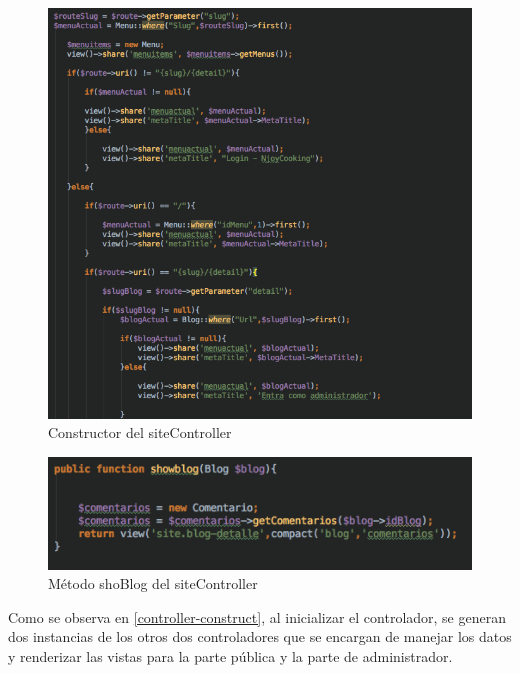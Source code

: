 \begin{figure}
\begin{center}
\includegraphics[width=1.0\textwidth]{imagenes/site-construct.png}
\caption{Constructor del siteController}
\label{site-construct}
\end{center}
\end{figure}

\begin{figure}
\begin{center}
\includegraphics[width=1.0\textwidth]{imagenes/site-showblog.png}
\caption{Método shoBlog del siteController}
\label{site-showblog}
\end{center}
\end{figure}

Como se observa en \ref{controller-construct}, al inicializar el controlador, se generan dos instancias de los otros dos controladores que se encargan de manejar los datos y renderizar las vistas para la parte pública y la parte de administrador.

